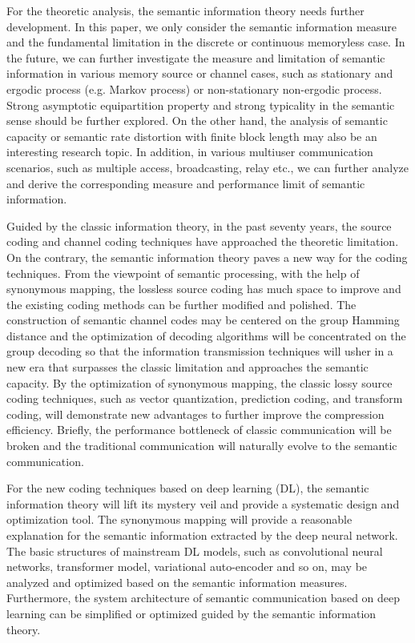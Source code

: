 \documentclass[12pt, draftclsnofoot,onecolumn]{IEEEtran}
\begin{document}
For the theoretic analysis, the semantic information theory needs further development. In this paper, we only consider the semantic information measure and the fundamental limitation in the discrete or continuous memoryless case. In the future, we can further investigate the measure and limitation of semantic information in various memory source or channel cases, such as stationary and ergodic process (e.g. Markov process) or non-stationary non-ergodic process. Strong asymptotic equipartition property and strong typicality in the semantic sense should be further explored. On the other hand, the analysis of semantic capacity or semantic rate distortion with finite block length may also be an interesting research topic. In addition, in various multiuser communication scenarios, such as multiple access, broadcasting, relay etc., we can further analyze and derive the corresponding measure and performance limit of semantic information.

Guided by the classic information theory, in the past seventy years, the source coding and channel coding techniques have approached the theoretic limitation. On the contrary, the semantic information theory paves a new way for the coding techniques. From the viewpoint of semantic processing, with the help of synonymous mapping, the lossless source coding has much space to improve and the existing coding methods can be further modified and polished. The construction of semantic channel codes may be centered on the group Hamming distance and the optimization of decoding algorithms will be concentrated on the group decoding so that the information transmission techniques will usher in a new era that surpasses the classic limitation and approaches the semantic capacity. By the optimization of synonymous mapping, the classic lossy source coding techniques, such as vector quantization, prediction coding, and transform coding, will demonstrate new advantages to further improve the compression efficiency. Briefly, the performance bottleneck of classic communication will be broken and the traditional communication will naturally evolve to the semantic communication.

For the new coding techniques based on deep learning (DL), the semantic information theory will lift its mystery veil and provide a systematic design and optimization tool. The synonymous mapping will provide a reasonable explanation for the semantic information extracted by the deep neural network. The basic structures of mainstream DL models, such as convolutional neural networks, transformer model, variational auto-encoder and so on, may be analyzed and optimized based on the semantic information measures. Furthermore, the system architecture of semantic communication based on deep learning can be simplified or optimized guided by the semantic information theory.
\end{document}
